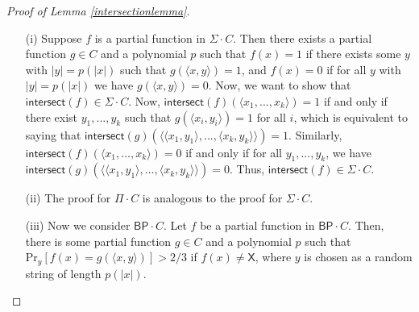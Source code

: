 \documentclass[11pt]{article}
\newcommand{\pr}{\text{Pr}}
\newcommand{\bp}{\textsf{BP}}
\newcommand{\strongbp}{\widehat{\textsf{BP}}}
\newcommand{\x}{\textsf{X}}
\newcommand{\intersect}{\textsf{intersect}}
\begin{document}
\begin{proof}[Proof of Lemma \ref{intersectionlemma}]
\begin{enumerate}
\item[]
\item[(i)] Suppose $f$ is a partial function in $\Sigma\cdot C$. Then there exists a partial function $g\in C$ and a polynomial $p$ such that $f(x) = 1$ if there exists some $y$ with $|y| = p(|x|)$ such that $g(\langle x,y\rangle) = 1$, and $f(x) = 0$ if for all $y$ with $|y| = p(|x|)$ we have $g(\langle x, y\rangle) = 0$. Now, we want to show that $\intersect(f) \in \Sigma \cdot C$. Now, $\intersect(f)(\langle x_1,...,x_k\rangle) = 1$ if and only if there exist $y_1,...,y_k$ such that $g(\langle x_i, y_i\rangle) = 1$ for all $i$, which is equivalent to saying that $\intersect(g)(\langle \langle x_1,y_1\rangle,...,\langle x_k,y_k\rangle\rangle) = 1$. Similarly, $\intersect(f)(\langle x_1,...,x_k\rangle) = 0$ if and only if for all $y_1,...,y_k$, we have $\intersect(g)(\langle \langle x_1,y_1\rangle,...,\langle x_k,y_k\rangle\rangle) = 0$. Thus, $\intersect(f) \in \Sigma \cdot C$.


\item[(ii)] The proof for $\Pi \cdot C$ is analogous to the proof for $\Sigma \cdot C$.


\item[(iii)] Now we consider $\bp \cdot C$. Let $f$ be a partial function in $\bp \cdot C$. Then, there is some partial function $g \in C$ and a polynomial $p$ such that $\pr_y[f(x) = g(\langle x,y\rangle)] > 2/3$ if $f(x) \ne \x$, where $y$ is chosen as a random string of length $p(|x|)$.


\end{enumerate}
\end{proof}
\end{document}
